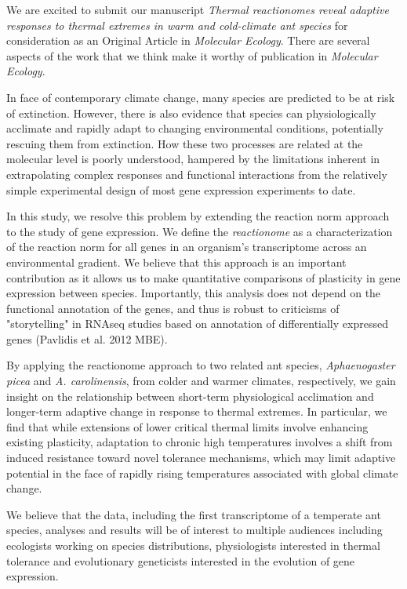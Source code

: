 \documentclass[letterpaper]{article}
\begin{document}
\thispagestyle{first}


We are excited to submit our manuscript \emph{Thermal
reactionomes reveal adaptive responses to thermal extremes in warm and
cold-climate ant species} for consideration as an Original Article in
\emph{Molecular Ecology}. There are
several aspects of the work that we think make it worthy of publication
in \emph{Molecular Ecology}.

In face of contemporary climate change, many species are predicted to be at 
risk of extinction. However, there is also evidence that species can physiologically
acclimate and rapidly adapt to changing environmental conditions, potentially
rescuing them from extinction. How these two processes are related at the molecular
level is poorly understood, hampered by the limitations inherent in extrapolating 
complex responses and functional interactions from the relatively simple experimental
design of most gene expression experiments to date. 

In this study, we resolve this problem by extending the reaction
norm approach to the study of gene expression. We define the
\emph{reactionome} as a characterization of the reaction norm for all
genes in an organism's transcriptome across an environmental gradient. 
We believe that this approach is an important contribution as it allows us
to make quantitative comparisons of plasticity in gene expression between
species. Importantly, this analysis does not depend on the functional 
annotation of the genes, and thus is robust to criticisms of "storytelling" 
in RNAseq studies based on annotation of differentially expressed 
genes (Pavlidis et al. 2012 MBE). 

By applying the reactionome approach to two related ant species,
\emph{Aphaenogaster picea} and \emph{A. carolinensis}, from colder and
warmer climates, respectively, we gain insight on the relationship
between short-term physiological acclimation and longer-term adaptive
change in response to thermal extremes. In particular, we find that while
extensions of lower critical thermal limits involve enhancing existing plasticity,
adaptation to chronic high temperatures involves a shift from induced resistance
toward novel tolerance mechanisms, which may limit adaptive potential 
in the face of rapidly rising temperatures associated with global climate change.

We believe that the data, including the first transcriptome of a
temperate ant species, analyses and results will be of interest to
multiple audiences including ecologists working on species
distributions, physiologists interested in thermal tolerance and
evolutionary geneticists interested in the evolution of gene expression.
\end{document}
